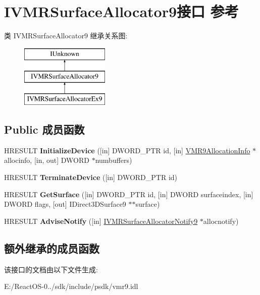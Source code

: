 \hypertarget{interface_i_v_m_r_surface_allocator9}{}\section{I\+V\+M\+R\+Surface\+Allocator9接口 参考}
\label{interface_i_v_m_r_surface_allocator9}
类 I\+V\+M\+R\+Surface\+Allocator9 继承关系图\+:\begin{figure}[H]
\begin{center}
\leavevmode
\includegraphics[height=3.000000cm]{interface_i_v_m_r_surface_allocator9}
\end{center}
\end{figure}
\subsection*{Public 成员函数}
\begin{DoxyCompactItemize}
\item 
\mbox{\label{interface_i_v_m_r_surface_allocator9_a5e5d4ced4da1683b22b377262fbbcd26}} 
H\+R\+E\+S\+U\+LT {\bfseries Initialize\+Device} (\mbox{[}in\mbox{]} D\+W\+O\+R\+D\+\_\+\+P\+TR id, \mbox{[}in\mbox{]} \hyperlink{struct___v_m_r9_allocation_info}{V\+M\+R9\+Allocation\+Info} $\ast$allocinfo, \mbox{[}in, out\mbox{]} D\+W\+O\+RD $\ast$numbuffers)
\item 
\mbox{\label{interface_i_v_m_r_surface_allocator9_a9177d607ae3d8233ac989376e0c014bf}} 
H\+R\+E\+S\+U\+LT {\bfseries Terminate\+Device} (\mbox{[}in\mbox{]} D\+W\+O\+R\+D\+\_\+\+P\+TR id)
\item 
\mbox{\label{interface_i_v_m_r_surface_allocator9_ad0bd9cf990f5ce12985ffa73704c908a}} 
H\+R\+E\+S\+U\+LT {\bfseries Get\+Surface} (\mbox{[}in\mbox{]} D\+W\+O\+R\+D\+\_\+\+P\+TR id, \mbox{[}in\mbox{]} D\+W\+O\+RD surfaceindex, \mbox{[}in\mbox{]} D\+W\+O\+RD flags, \mbox{[}out\mbox{]} I\+Direct3\+D\+Surface9 $\ast$$\ast$surface)
\item 
\mbox{\label{interface_i_v_m_r_surface_allocator9_a4ca7d6d907179fb6a517da4f3939233c}} 
H\+R\+E\+S\+U\+LT {\bfseries Advise\+Notify} (\mbox{[}in\mbox{]} \hyperlink{interface_i_v_m_r_surface_allocator_notify9}{I\+V\+M\+R\+Surface\+Allocator\+Notify9} $\ast$allocnotify)
\end{DoxyCompactItemize}
\subsection*{额外继承的成员函数}


该接口的文档由以下文件生成\+:\begin{DoxyCompactItemize}
\item 
E\+:/\+React\+O\+S-\/0../sdk/include/psdk/vmr9.\+idl\end{DoxyCompactItemize}
